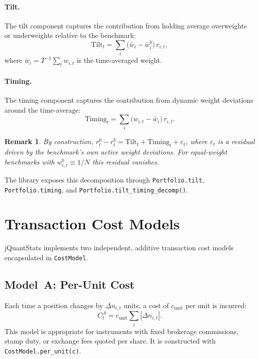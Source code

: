 \documentclass[11pt,a4paper]{article}
\newtheorem{remark}{Remark}
\begin{document}
\paragraph{Tilt.}
The tilt component captures the contribution from holding average overweights
or underweights relative to the benchmark:
\begin{equation}
  \text{Tilt}_t = \sum_i \bigl(\bar{w}_i - \bar{w}_i^b\bigr)\,r_{i,t},
\end{equation}
where $\bar{w}_i = T^{-1}\sum_t w_{i,t}$ is the time-averaged weight.

\paragraph{Timing.}
The timing component captures the contribution from dynamic weight deviations
around the time-average:
\begin{equation}
  \text{Timing}_t = \sum_i \bigl(w_{i,t} - \bar{w}_i\bigr)\,r_{i,t}.
\end{equation}

\begin{remark}
By construction, $r_t^p - r_t^b = \text{Tilt}_t + \text{Timing}_t + \varepsilon_t$,
where $\varepsilon_t$ is a residual driven by the benchmark's own active
weight deviations.  For equal-weight benchmarks with $w_{i,t}^b \equiv 1/N$
this residual vanishes.
\end{remark}

The library exposes this decomposition through \texttt{Portfolio.tilt},
\texttt{Portfolio.timing}, and \texttt{Portfolio.tilt\_timing\_decomp()}.

\section{Transaction Cost Models}
\label{sec:costs}

jQuantStats implements two independent, additive transaction cost models
encapsulated in \texttt{CostModel}.

\subsection{Model~A: Per-Unit Cost}

Each time a position changes by $\Delta n_{i,t}$ units, a cost of
$c_{\text{unit}}$ per unit is incurred:
\begin{equation}
  C_t^A = c_{\text{unit}} \sum_i |\Delta n_{i,t}|.
\end{equation}
This model is appropriate for instruments with fixed brokerage commissions,
stamp duty, or exchange fees quoted per share.  It is constructed with
\texttt{CostModel.per\_unit(c)}.
\end{document}
